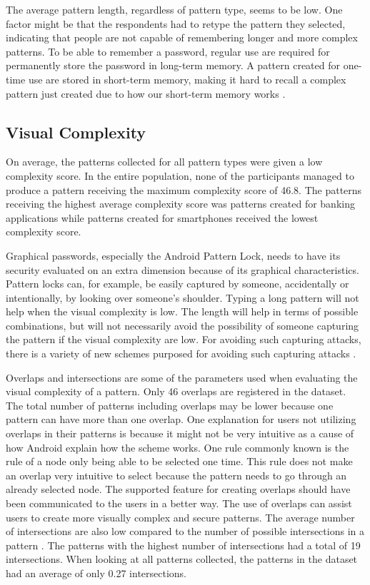       The average pattern length, regardless of pattern type, seems to be low. One factor might be that the respondents had to retype the pattern they selected, indicating that people are not capable of remembering longer and more complex patterns. To be able to remember a password, regular use are required for permanently store the password in long-term memory. A pattern created for one-time use are stored in short-term memory, making it hard to recall a complex pattern just created due to how our short-term memory works \cite{DeAngeli}.

    \subsection{Visual Complexity}
      On average, the patterns collected for all pattern types were given a low complexity score. In the entire population, none of the participants managed to produce a pattern receiving the maximum complexity score of 46.8. The patterns receiving the highest average complexity score was patterns created for banking applications while patterns created for smartphones received the lowest complexity score. 

      Graphical passwords, especially the Android Pattern Lock, needs to have its security evaluated on an extra dimension because of its graphical characteristics. Pattern locks can, for example, be easily captured by someone, accidentally or intentionally, by looking over someone's shoulder. Typing a long pattern will not help when the visual complexity is low. The length will help in terms of possible combinations, but will not necessarily avoid the possibility of someone capturing the pattern if the visual complexity are low.  For avoiding such capturing attacks, there is a variety of new schemes purposed for avoiding such capturing attacks \cite{Wiedenbeck, IPAS}. 

      Overlaps and intersections are some of the parameters used when evaluating the visual complexity of a pattern. Only 46 overlaps are registered in the dataset. The total number of patterns including overlaps may be lower because one pattern can have more than one overlap. One explanation for users not utilizing overlaps in their patterns is because it might not be very intuitive as a cause of how Android explain how the scheme works. One rule commonly known is the rule of a node only being able to be selected one time. This rule does not make an overlap very intuitive to select because the pattern needs to go through an already selected node. The supported feature for creating overlaps should have been communicated to the users in a better way. The use of overlaps can assist users to create more visually complex and secure patterns. The average number of intersections are also low compared to the number of possible intersections in a pattern \cite{Sun}. The patterns with the highest number of intersections had a total of 19 intersections. When looking at all patterns collected, the patterns in the dataset had an average of only 0.27 intersections. 

